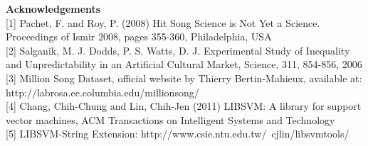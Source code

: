 \documentclass[11pt]{amsart}
\begin{document}
{\bf Acknowledgements \bf} \\

[1] Pachet, F. and Roy, P. (2008) Hit Song Science is Not Yet a Science. Proceedings of Ismir 2008, pages 355-360, Philadelphia, USA \\

[2] Salganik, M. J. Dodds, P. S. Watts, D. J. Experimental Study of Inequality and Unpredictability in an Artificial Cultural Market, Science, 311, 854-856, 2006 \\

[3] Million Song Dataset, official website by Thierry Bertin-Mahieux, available at: \\ 
http://labrosa.ee.columbia.edu/millionsong/ \\

[4] Chang, Chih-Chung and Lin, Chih-Jen (2011) LIBSVM: A library for support vector machines,  ACM Transactions on Intelligent Systems and Technology\\

[5] LIBSVM-String Extension: http://www.csie.ntu.edu.tw/~cjlin/libsvmtools/ 
\end{document}
